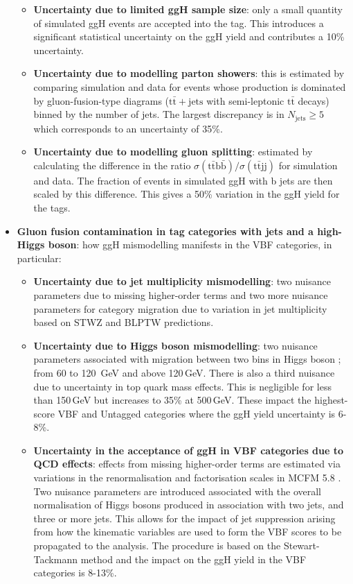 \begin{itemize}[noitemsep]
{\begin{itemize}[noitemsep]
            \item[\textbullet] \textbf{Uncertainty due to limited ggH sample size}: only a small quantity of simulated ggH events are accepted into the \ttH tag. This introduces a significant statistical uncertainty on the ggH yield and contributes a 10\% uncertainty.
            \item[\textbullet] \textbf{Uncertainty due to modelling parton showers}: this is estimated by comparing simulation and data for events whose production is dominated by gluon-fusion-type diagrams ($\mathrm{t}\bar{\mathrm{t}}+\mathrm{jets}$ with semi-leptonic $\mathrm{t}\bar{\mathrm{t}}$ decays) binned by the number of jets. The largest discrepancy is in $N_{\mathrm{jets}}\geq{5}$ which corresponds to an uncertainty of 35\%.
            \item[\textbullet] \textbf{Uncertainty due to modelling gluon splitting}: estimated by calculating the difference in the ratio $\sigma(\mathrm{t\bar{t}b\bar{b}})/\sigma(\mathrm{t\bar{t}jj})$ for simulation and data. The fraction of events in simulated ggH with b jets are then scaled by this difference. This gives a 50\% variation in the ggH yield for the \ttH tags. 
        \end{itemize}}
    \item{\textbf{Gluon fusion contamination in tag categories with jets and a high-\pt Higgs boson}: how ggH mismodelling manifests in the VBF categories, in particular:
        \begin{itemize}[noitemsep]
            \item[\textbullet] \textbf{Uncertainty due to jet multiplicity mismodelling}: two nuisance parameters due to missing higher-order terms and two more nuisance parameters for category migration due to variation in jet multiplicity based on STWZ \cite{JetPtResum} and BLPTW \cite{JetPtResum,TheoryUncertHiggs1J,ResummedHiggsPredictions} predictions. 
            \item[\textbullet] \textbf{Uncertainty due to Higgs boson \pt mismodelling}: two nuisance parameters associated with migration between two bins in Higgs boson \pt; from 60 to 120 \,GeV and above 120\,GeV. There is also a third nuisance due to uncertainty in top quark mass effects. This is negligible for \pt less than 150\,GeV but increases to 35\% at 500\,GeV. These impact the highest-score VBF and Untagged categories where the ggH yield uncertainty is 6-8\%.
            \item[\textbullet] \textbf{Uncertainty in the acceptance of ggH in VBF categories due to QCD effects}: effects from missing higher-order terms are estimated via variations in the renormalisation and factorisation scales in MCFM 5.8 \cite{MCFM}. Two nuisance parameters are introduced associated with the overall normalisation of Higgs bosons produced in association with two jets, and three or more jets. This allows for the impact of jet suppression arising from how the kinematic variables are used to form the VBF scores to be propagated to the analysis. The procedure is based on the Stewart-Tackmann method \cite{StewartTackmann,GangalTackmann} and the impact on the ggH yield in the VBF categories is 8-13\%. 

\end{itemize}}
\end{itemize}

